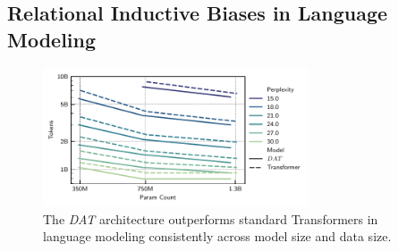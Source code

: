 

\subsection{Relational Inductive Biases in Language Modeling}\label{ssec:fineweb}

\begin{figure}[t]
    \centering
    \includegraphics[width=0.7\textwidth]{figs/experiments/fineweb/tokens_vs_param_count.pdf}
    \caption{The \textit{DAT} architecture outperforms standard Transformers in language modeling consistently across model size and data size. }\label{fig:fineweb_param_data}
\end{figure}

